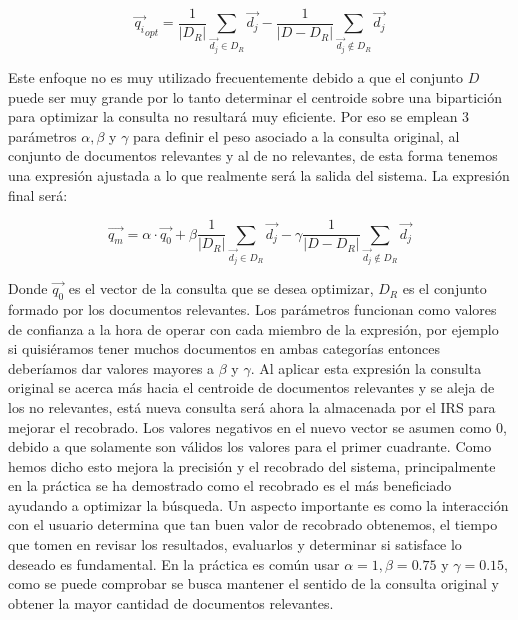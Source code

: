 \documentclass[runningheads,a4paper]{llncs}
\begin{document}
\begin{equation}
	\overrightarrow{{q_i}}_{opt} = \frac{1}{|D_R|} \sum_{\overrightarrow{d_j} \in D_R} \overrightarrow{d_j} - \frac{1}{|D - D_R|} \sum_{\overrightarrow{d_j} \notin D_R} \overrightarrow{d_j} 
\end{equation}

Este enfoque no es muy utilizado frecuentemente debido a que el conjunto $D$ puede ser muy grande por lo tanto determinar el centroide sobre una bipartición para optimizar la consulta no resultará muy eficiente. Por eso se emplean 3 parámetros $\alpha, \beta $ y $\gamma$  para definir el peso asociado a la consulta original, al conjunto de documentos relevantes y al de no relevantes, de esta forma tenemos una expresión ajustada a lo que realmente será la salida del sistema. La expresión final será:

\begin{equation}
	\overrightarrow{q_m} = \alpha · \overrightarrow{q_0} + \beta \frac{1}{|D_R|} \sum_{\overrightarrow{d_j} \in D_R} \overrightarrow{d_j} - \gamma \frac{1}{|D - D_R|} \sum_{\overrightarrow{d_j} \notin D_R} \overrightarrow{d_j}
\end{equation}

Donde $\overrightarrow{q_0}$ es el vector de la consulta que se desea optimizar, $D_R$ es el conjunto formado por los documentos relevantes. Los parámetros funcionan como valores de confianza a la hora de operar con cada miembro de la expresión, por ejemplo si quisiéramos tener muchos documentos en ambas categorías entonces deberíamos dar valores mayores a $\beta$ y $\gamma$. Al aplicar esta expresión la consulta original se acerca más hacia el centroide de documentos relevantes y se aleja de los no relevantes, está nueva consulta será ahora la almacenada por el IRS para mejorar el recobrado. Los valores negativos en el nuevo vector se asumen como 0, debido a que solamente son válidos los valores para el primer cuadrante. Como hemos dicho esto mejora la precisión y el recobrado del sistema, principalmente en la práctica se ha demostrado como el recobrado es el más beneficiado ayudando a optimizar la búsqueda. Un aspecto importante es como la interacción con el usuario determina que tan buen valor de recobrado obtenemos, el tiempo que tomen en revisar los resultados, evaluarlos y determinar si satisface lo deseado es fundamental. En la práctica es común usar $\alpha = 1, \beta = 0.75$ y $\gamma = 0.15$, como se puede comprobar se busca mantener el sentido de la consulta original y obtener la mayor cantidad de documentos relevantes.
\end{document}
